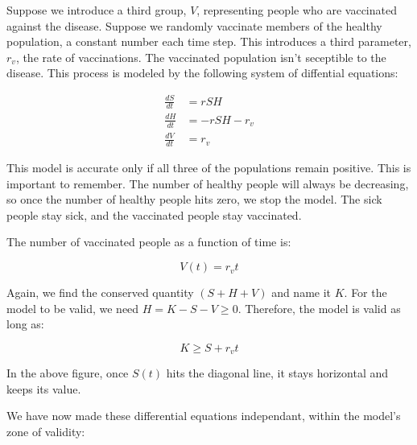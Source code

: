 \documentclass{article}
\begin{document}
Suppose we introduce a third group, $V$, representing people who are vaccinated	
	against the disease.
Suppose we randomly vaccinate members of the healthy population,
	a constant number each time step.
This introduces a third parameter, $r_v$, the rate of vaccinations.
The vaccinated population isn't seceptible to the disease.
This process is modeled by the following system of diffential equations:

\begin{align*}
\frac{dS}{dt} & = r S H \\
\frac{dH}{dt} & = - r S H - r_v \\
\frac{dV}{dt} & = r_v
\end{align*}

This model is accurate only if all three of the populations remain
	positive.
This is important to remember.
The number of healthy people will always be decreasing, so once
	the number of healthy people hits zero, we stop the model.
The sick people stay sick, and the vaccinated people stay vaccinated.

The number of vaccinated people as a function of time is:

\[ V(t) = r_v t \]

Again, we find the conserved quantity $\left( S + H + V \right)$ and
	name it $K$.
For the model to be valid, we need $H = K - S - V \geq 0$.
Therefore, the model is valid as long as:

\[ K \geq S + r_v t \]


In the above figure, once $S(t)$ hits the diagonal line,
	it stays horizontal and keeps its value.

We have now made these differential equations independant,
	within the model's zone of validity:
\end{document}
